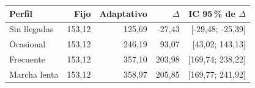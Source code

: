 \begin{tabular}{lrrrr}
\toprule
Perfil & Fijo & Adaptativo & $\Delta$ & IC 95\,\% de $\Delta$\\\midrule
Sin llegadas & 153,12 & 125,69 & -27,43 & [-29,48; -25,39]\\
Ocasional & 153,12 & 246,19 & 93,07 & [43,02; 143,13]\\
Frecuente & 153,12 & 357,10 & 203,98 & [169,74; 238,22]\\
Marcha lenta & 153,12 & 358,97 & 205,85 & [169,77; 241,92]\\
\bottomrule
\end{tabular}
